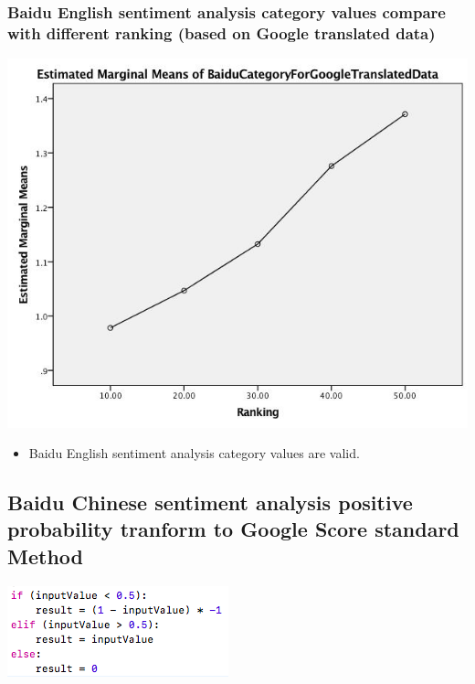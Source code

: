 \subsubsection{Baidu English sentiment analysis category values compare with different ranking (based on Google translated data)}
\label{sec:org4297533}
\begin{center}
\includegraphics[width=.9\linewidth]{./img/MarginalMeansOfBaiduCategoryFroGoogleTranslatedData.jpg}
\end{center}
\begin{itemize}
\item Baidu English sentiment analysis category values are valid.
\end{itemize}

\subsection{Baidu Chinese sentiment analysis positive probability tranform to Google Score standard Method}
\label{sec:orgbecb070}
\begin{center}
\includegraphics[width=.9\linewidth]{./img/baiduPositiveProbabilityTranformToGoogleScoreStandard.png}
\end{center}

